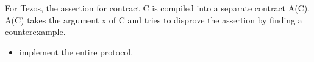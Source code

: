 \documentclass[a4paper,11pt]{article}
\begin{document}
For Tezos, the assertion for contract C is compiled into a separate contract A(C). A(C) takes the argument x of C and tries to disprove the assertion by finding a counterexample.
\begin{itemize}
\item  implement the entire protocol. 
\end{itemize}









\end{document}
